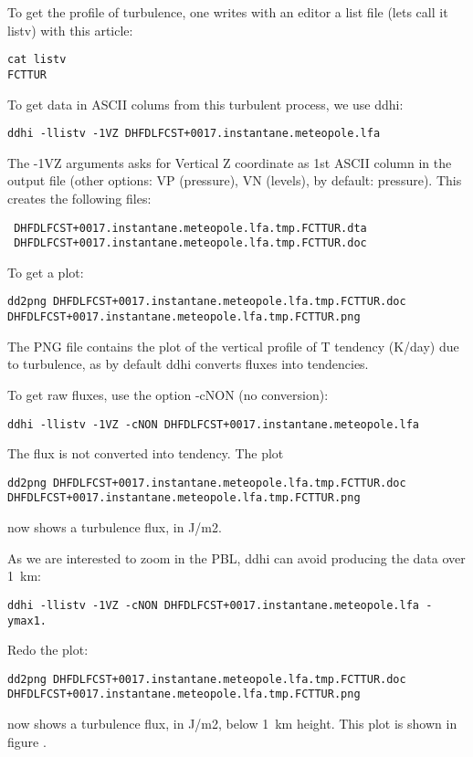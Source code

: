 \p To get the profile of turbulence, one writes with an editor a list file (lets call it listv) with this article:
{\small \begin{verbatim} 
cat listv
FCTTUR
\end{verbatim}}

\noi To get data in ASCII colums from this turbulent process, we use ddhi:
{\small \begin{verbatim} 
ddhi -llistv -1VZ DHFDLFCST+0017.instantane.meteopole.lfa
\end{verbatim}}
\noi The -1VZ arguments asks for Vertical Z coordinate as 1st ASCII column in the output file (other options: VP (pressure), VN (levels), by default: pressure). This creates the following files:
{\small \begin{verbatim} 
 DHFDLFCST+0017.instantane.meteopole.lfa.tmp.FCTTUR.dta
 DHFDLFCST+0017.instantane.meteopole.lfa.tmp.FCTTUR.doc
\end{verbatim}}
\noi To get a plot:
{\tiny \begin{verbatim} 
dd2png DHFDLFCST+0017.instantane.meteopole.lfa.tmp.FCTTUR.doc DHFDLFCST+0017.instantane.meteopole.lfa.tmp.FCTTUR.png
\end{verbatim}}
\noi The PNG file contains the plot of the vertical profile of T tendency (K/day) due to turbulence, as by default ddhi converts fluxes into tendencies.

\noi To get raw fluxes, use the option -cNON (no conversion):
{\small \begin{verbatim} 
ddhi -llistv -1VZ -cNON DHFDLFCST+0017.instantane.meteopole.lfa
\end{verbatim}}
\noi The flux is not converted into tendency.
\noi The plot
{\tiny \begin{verbatim} 
dd2png DHFDLFCST+0017.instantane.meteopole.lfa.tmp.FCTTUR.doc DHFDLFCST+0017.instantane.meteopole.lfa.tmp.FCTTUR.png
\end{verbatim}}
\noi now shows a turbulence flux, in J/m2.

\p As we are interested to zoom in the PBL, ddhi can avoid producing the data over 1~km:
{\small \begin{verbatim} 
ddhi -llistv -1VZ -cNON DHFDLFCST+0017.instantane.meteopole.lfa -ymax1.
\end{verbatim}}
\noi Redo the plot:
{\tiny \begin{verbatim} 
dd2png DHFDLFCST+0017.instantane.meteopole.lfa.tmp.FCTTUR.doc DHFDLFCST+0017.instantane.meteopole.lfa.tmp.FCTTUR.png
\end{verbatim}}
\noi now shows a turbulence flux, in J/m2, below 1~km height. This plot is shown in figure .

